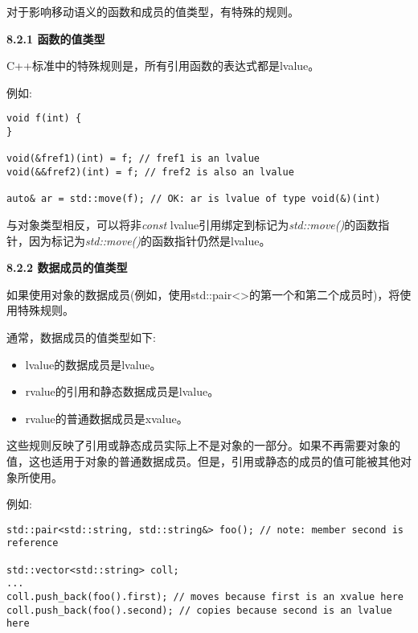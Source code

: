 对于影响移动语义的函数和成员的值类型，有特殊的规则。\par

\hspace*{\fill} \par %
\textbf{8.2.1 函数的值类型}

C++标准中的特殊规则是，所有引用函数的表达式都是lvalue。\par

例如:\par

\begin{lstlisting}[caption={}]
void f(int) {
}

void(&fref1)(int) = f; // fref1 is an lvalue
void(&&fref2)(int) = f; // fref2 is also an lvalue

auto& ar = std::move(f); // OK: ar is lvalue of type void(&)(int)
\end{lstlisting}

与对象类型相反，可以将非\textit{const} lvalue引用绑定到标记为\textit{std::move()}的函数指针，因为标记为\textit{std::move()}的函数指针仍然是lvalue。\par

\hspace*{\fill} \par %
\textbf{8.2.2 数据成员的值类型}

如果使用对象的数据成员(例如，使用std::pair<>的第一个和第二个成员时)，将使用特殊规则。\par

通常，数据成员的值类型如下:\par

\begin{itemize}
	\item lvalue的数据成员是lvalue。
	\item rvalue的引用和静态数据成员是lvalue。
	\item rvalue的普通数据成员是xvalue。
\end{itemize}

这些规则反映了引用或静态成员实际上不是对象的一部分。如果不再需要对象的值，这也适用于对象的普通数据成员。但是，引用或静态的成员的值可能被其他对象所使用。\par

例如:\par

\begin{lstlisting}[caption={}]
std::pair<std::string, std::string&> foo(); // note: member second is reference

std::vector<std::string> coll;
...
coll.push_back(foo().first); // moves because first is an xvalue here
coll.push_back(foo().second); // copies because second is an lvalue here
\end{lstlisting}

